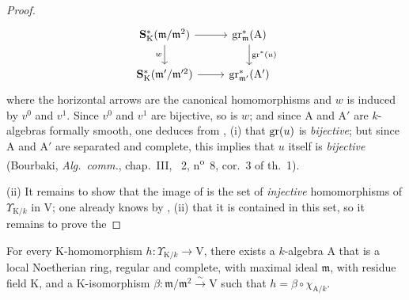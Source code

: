 \begin{proof}
\[\begin{tikzcd}
    \mathbf{S}^*_\mathrm{K}(\mathfrak{m}/\mathfrak{m}^2) \ar[r] \ar[d,"w"'] & \gr^*_\mathfrak{m}(\mathrm{A}) \ar[d,"\gr^*(u)"]\\
    \mathbf{S}^*_\mathrm{K}(\mathfrak{m}'/\mathfrak{m}'^2) \ar[r] & \gr^*_{\mathfrak{m}'}(\mathrm{A}')
  \end{tikzcd}
\]
where the horizontal arrows are the canonical homomorphisms and $w$ is induced by $v^0$ and $v^1$. Since $v^0$ and $v^1$ are bijective, so is $w$; and since $\mathrm{A}$ and $\mathrm{A}'$ are $k$-algebras formally smooth, one deduces from , (i) that $\operatorname{gr}(u)$ is \emph{bijective}; but since $\mathrm{A}$ and $\mathrm{A}'$ are separated and complete, this implies that $u$ itself is \emph{bijective} (Bourbaki, \emph{Alg.~comm.}, chap.~III, \textsection~2, n\textsuperscript{o}~8, cor.~3 of th.~1).

(ii) It remains to show that the image of  is the set of \emph{injective} homomorphisms of $\Upsilon_{\mathrm{K}/k}$ in $\mathrm{V}$; one already knows by , (ii) that it is contained in this set, so it remains to prove the
\end{proof}

\begin{lemma}[22.2.5.2]
\label{0.22.2.5.2}
For every $\mathrm{K}$-homomorphism $h:\Upsilon_{\mathrm{K}/k}\to\mathrm{V}$, there exists a $k$-algebra $\mathrm{A}$ that is a local Noetherian ring, regular and complete, with maximal ideal $\mathfrak{m}$, with residue field $\mathrm{K}$, and a $\mathrm{K}$-isomorphism $\beta:\mathfrak{m}/\mathfrak{m}^2\xrightarrow{\sim}\mathrm{V}$ such that $h=\beta\circ\chi_{\mathrm{A}/k}$.
\end{lemma}

